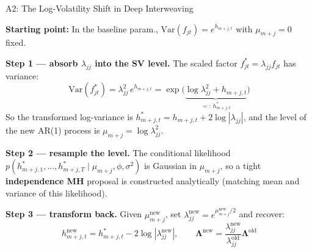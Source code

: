 \documentclass[10pt]{beamer}\usepackage[]{graphicx}\usepackage[table]{xcolor}
\begin{document}

\begin{frame}{A2: The Log-Volatility Shift in Deep Interweaving}

  \textbf{Starting point:} In the baseline param., $\mathrm{Var}(f_{jt}) = e^{h_{m+j,t}}$
  with $\mu_{m+j}=0$ fixed.

  \vspace{0.3em}

  \textbf{Step 1 --- absorb $\lambda_{jj}$ into the SV level.}
  The scaled factor $f_{jt}^* = \lambda_{jj} f_{jt}$ has variance:
  \[
    \mathrm{Var}(f_{jt}^*)
    = \lambda_{jj}^2\, e^{h_{m+j,t}}
    = \exp\!\bigl(\underbrace{\log\lambda_{jj}^2 + h_{m+j,t}}_{=:\, h^*_{m+j,t}}\bigr)
  \]
  So the transformed log-variance is $h^*_{m+j,t} = h_{m+j,t} + 2\log|\lambda_{jj}|$,
  and the level of the new AR(1) process is $\mu_{m+j} = \log\lambda_{jj}^2$.

  \vspace{0.3em}

  \textbf{Step 2 --- resample the level.}
  The conditional likelihood
  $p(h^*_{m+j,1},\ldots,h^*_{m+j,T} \mid \mu_{m+j}, \phi, \sigma^2)$
  is Gaussian in $\mu_{m+j}$, so a tight \textbf{independence MH} proposal
  is constructed analytically (matching mean and variance of this likelihood).

  \vspace{0.3em}

  \textbf{Step 3 --- transform back.}
  Given $\mu_{m+j}^{\mathrm{new}}$, set
  $\lambda_{jj}^{\mathrm{new}} = e^{\mu_{m+j}^{\mathrm{new}}/2}$ and recover:
  \[
    h_{m+j,t}^{\mathrm{new}}
    = h^*_{m+j,t} - 2\log|\lambda_{jj}^{\mathrm{new}}|,
    \qquad
    \boldsymbol{\Lambda}^{\mathrm{new}} = \frac{\lambda_{jj}^{\mathrm{new}}}{\lambda_{jj}^{\mathrm{old}}}\boldsymbol{\Lambda}^{\mathrm{old}}
  \]

\end{frame}

\end{document}

